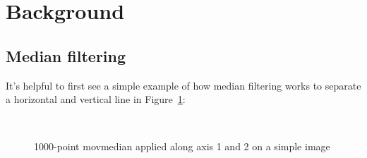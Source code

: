 \documentclass[letter,12pt]{article}
\begin{document}
\section{Background}

\subsection{Median filtering}

It's helpful to first see a simple example of how median filtering works to separate a horizontal and vertical line in Figure~\ref{fig:simplemedfilter}:

\begin{figure}[ht]
	\vspace*{-0.5cm}
	\centering
	\\
	\hspace{0.4em}
	\caption{1000-point movmedian applied along axis 1 and 2 on a simple image}%
	\label{fig:simplemedfilter}
\end{figure}
\end{document}
